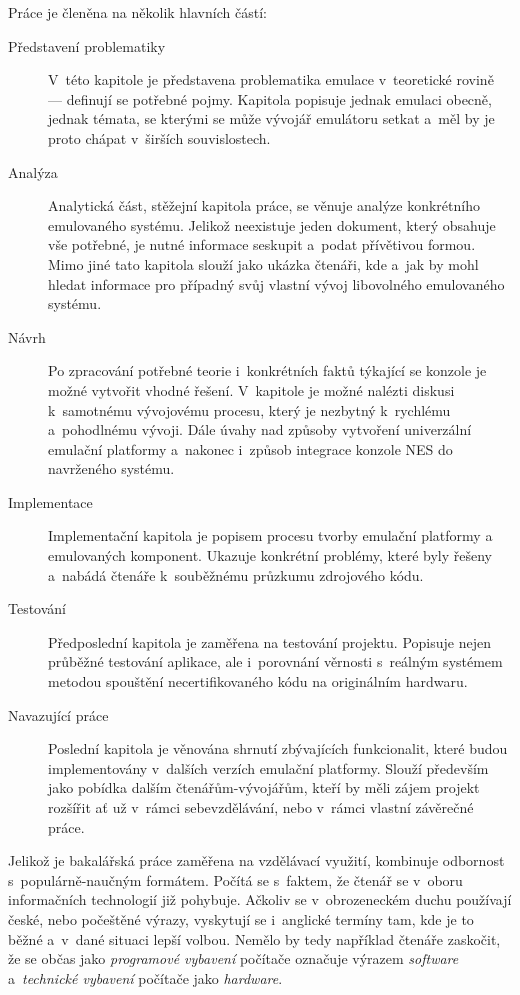 Práce je členěna na několik hlavních částí:
\begin{description}
	\item[Představení problematiky] V~této kapitole je představena problematika emulace v~teoretické rovině --- definují se potřebné pojmy. Kapitola popisuje jednak emulaci obecně, jednak témata, se kterými se může vývojář emulátoru setkat a~měl by je proto chápat v~širších souvislostech.
	\item[Analýza] Analytická část, stěžejní kapitola práce, se věnuje analýze konkrétního emulovaného systému. Jelikož neexistuje jeden dokument, který obsahuje vše potřebné, je nutné informace seskupit a~podat přívětivou formou. Mimo jiné tato kapitola slouží jako ukázka čtenáři, kde a~jak by mohl hledat informace pro případný svůj vlastní vývoj libovolného emulovaného systému.
	\item[Návrh] Po zpracování potřebné teorie i~konkrétních faktů týkající se konzole je možné vytvořit vhodné řešení. V~kapitole je možné nalézti diskusi k~samotnému vývojovému procesu, který je nezbytný k~rychlému a~pohodlnému vývoji. Dále úvahy nad způsoby vytvoření univerzální emulační platformy a~nakonec i~způsob integrace konzole NES do navrženého systému.
	\item[Implementace] Implementační kapitola je popisem procesu tvorby emulační platformy a emulovaných komponent. Ukazuje konkrétní problémy, které byly řešeny a~nabádá čtenáře k~souběžnému průzkumu zdrojového kódu.
	\item[Testování] Předposlední kapitola je zaměřena na testování projektu. Popisuje nejen průběžné testování aplikace, ale i~porovnání věrnosti s~reálným systémem metodou spouštění necertifikovaného kódu na originálním hardwaru.
	\item[Navazující práce] Poslední kapitola je věnována shrnutí zbývajících funkcionalit, které budou implementovány v~dalších verzích emulační platformy. Slouží především jako pobídka dalším čtenářům-vývojářům, kteří by měli zájem projekt rozšířit ať už v~rámci sebevzdělávání, nebo v~rámci vlastní závěrečné práce.
\end{description}

\begin{note*}[Terminologie]
	Jelikož je bakalářská práce zaměřena na vzdělávací využití, kombinuje odbornost s~populárně-naučným formátem. Počítá se s~faktem, že čtenář se v~oboru informačních technologií již pohybuje. Ačkoliv se v~obrozeneckém duchu používají české, nebo počeštěné výrazy, vyskytují se i~anglické termíny tam, kde je to běžné a~v~dané situaci lepší volbou. Nemělo by tedy například čtenáře zaskočit, že se občas jako \emph{programové vybavení} počítače označuje výrazem \emph{software} a~\emph{technické vybavení} počítače jako \emph{hardware}.	
\end{note*}

